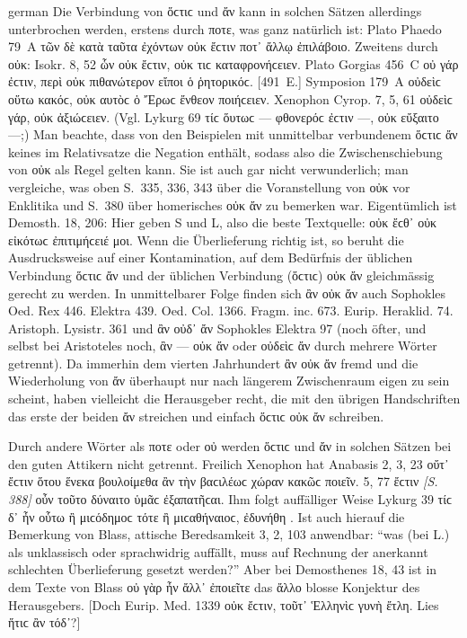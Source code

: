 \begin{otherlanguage*}{german}
Die Verbindung von ὅϲτιϲ und ἄν kann in solchen Sätzen allerdings unterbrochen werden, erstens durch ποτε, was ganz natürlich ist: Plato Phaedo 79~A τῶν δὲ κατὰ ταῦτα ἐχόντων οὐκ ἔϲτιν  ποτ᾽  ἄλλῳ ἐπιλάβοιο. Zweitens durch οὐκ: Isokr. 8, 52 ὧν οὐκ ἔϲτιν,  οὐκ  τιϲ καταφρονήϲειεν. Plato Gorgias 456~C οὐ γάρ ἐϲτιν, περὶ  οὐκ  πιθανώτερον εἴποι ὁ ῥητορικόϲ. [491~Ε.] Symposion 179~Α οὐδεὶϲ οὕτω κακόϲ,  οὐκ  αυτὸϲ ὁ Ἔρωϲ ἔνθεον ποιήϲειεν. Xenophon Cyrop. 7, 5, 61 οὐδεὶϲ γάρ,  οὐκ  ἀξιώϲειεν. (Vgl. Lykurg 69 τίϲ ὅυτωϲ — φθονερόϲ ἐϲτιν —,  οὐκ  εὔξαιτο —;) Man beachte, dass von den Beispielen mit unmittelbar verbundenem ὅϲτιϲ ἄν keines im Relativsatze die Negation enthält, sodass also die Zwischenschiebung von οὐκ als Regel gelten kann. Sie ist auch gar nicht verwunderlich; man vergleiche, was oben S.~335, 336, 343 über die Voranstellung von οὐκ vor Enklitika und S.~380 über homerisches οὐκ ἄν zu bemerken war. Eigentümlich ist Demosth. 18, 206: Hier geben S und L, also die beste Textquelle: οὐκ ἔϲθ᾽  οὐκ  εἰκότωϲ ἐπιτιμήϲειέ μοι. Wenn die Überlieferung richtig ist, so beruht die Ausdrucksweise auf einer Kontamination, auf dem Bedürfnis der üblichen Verbindung ὅϲτιϲ ἄν und der üblichen Verbindung (ὅϲτιϲ) οὐκ ἄν gleichmässig gerecht zu werden. In unmittelbarer Folge finden sich ἂν οὐκ ἄν auch Sophokles Oed. Rex 446. Elektra 439. Oed. Col. 1366. Fragm. inc. 673. Eurip. Heraklid. 74. Aristoph. Lysistr. 361 und ἂν οὐδ᾽ ἄν Sophokles Elektra 97 (noch öfter, und selbst bei Aristoteles noch, ἂν — οὐκ ἄν oder οὐδεὶϲ ἄν durch mehrere Wörter getrennt). Da immerhin dem vierten Jahrhundert ἂν οὐκ ἄν fremd und die Wiederholung von ἄν überhaupt nur nach längerem Zwischenraum eigen zu sein scheint, haben vielleicht die Herausgeber recht, die mit den übrigen Handschriften das erste der beiden ἄν streichen und einfach ὅϲτιϲ οὐκ ἄν schreiben.

Durch andere Wörter als ποτε oder οὐ werden ὅϲτιϲ und ἄν in solchen Sätzen bei den guten Attikern nicht getrennt. Freilich Xenophon hat Anabasis 2, 3, 23 οὔτ᾽ ἔϲτιν ὅτου ἕνεκα βουλοίμεθα ἂν τὴν βαϲιλέωϲ χώραν κακῶϲ ποιεῖν. 5, 77 ἔϲτιν \hypertarget{p388}{\emph{[S. 388]}}\label{p388} οὖν  τοῦτο  δύναιτο ὑμᾶϲ ἐξαπατῆϲαι. Ihm folgt auffälliger Weise Lykurg 39 τίϲ δ᾽ ἦν οὗτω ἢ μιϲόδημοϲ τότε ἢ μιϲαθήναιοϲ,  ἐδυνήθη . Ist auch hierauf die Bemerkung von Blass, attische Beredsamkeit 3, 2, 103 anwendbar: “was (bei L.) als unklassisch oder sprachwidrig auffällt, muss auf Rechnung der anerkannt schlechten Überlieferung gesetzt werden?” Aber bei Demosthenes 18, 43 ist in dem Texte von Blass οὐ γὰρ ἦν  ἄλλ᾽  ἐποιεῖτε das ἄλλο blosse Konjektur des Herausgebers. [Doch Eurip. Med. 1339 οὐκ ἔϲτιν,  τοῦτ᾽  Ἑλληνὶϲ γυνὴ ἔτλη. Lies ἥτιϲ ἂν τόδ᾽?]


\end{otherlanguage*}

